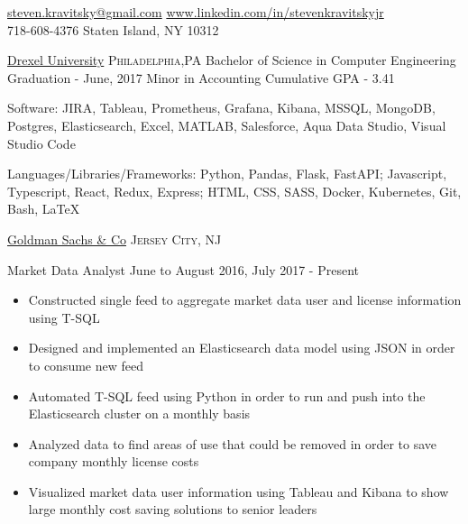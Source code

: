 \documentclass[10pt,letterpaper]{article}
\begin{document}
\sloppy  %

\nobreakvspace{0.3em}  %

\noindent\href{mailto:steven.kravitsky@gmail.com}{steven.kravitsky\mbox{}@\mbox{}gmail.com}\sbull
\href{http://www.linkedin.com/in/stevenkravitskyjr}{www.linkedin.com/in/stevenkravitskyjr}
\\
718-608-4376\sbull
Staten Island, NY 10312

\spacedhrule{0.9em}{-0.4em}  %


\headedsection
  {\href{http://www.drexel.edu/}{Drexel University}}
  {\textsc{Philadelphia,PA}} {%
  \headedsubsectiontwo
    {Bachelor of Science in Computer Engineering}
    {Graduation - June, 2017}
    {Minor in Accounting}
    {Cumulative GPA - 3.41}
}

\spacedhrule{0.9em}{-0.4em}


\inlineheadsection  %
  {Software:}
  {JIRA, Tableau, Prometheus, Grafana, Kibana, MSSQL, MongoDB, Postgres, Elasticsearch, Excel, MATLAB, Salesforce, Aqua Data Studio, Visual Studio Code}

\vspace{0.1em}
\inlineheadsection
  {Languages/Libraries/Frameworks:}
  {Python, Pandas, Flask, FastAPI; Javascript, Typescript, React, Redux, Express; HTML, CSS, SASS, Docker, Kubernetes, Git, Bash, LaTeX}

\spacedhrule{0.9em}{-0.4em}


\headedsection  %
  {\href{http://www.goldmansachs.com/}{Goldman Sachs \& Co}}
  {\textsc{Jersey City, NJ}} {%
  \headedsubsection
    {Market Data  Analyst}
    {June to August 2016, July 2017 - Present}
    {\begin{itemize}
    \item Constructed single feed to aggregate  market data user and license information using T-SQL
    \item Designed and implemented an Elasticsearch data model using JSON in order to consume new feed
    \item Automated T-SQL feed using Python in order to run and push into the Elasticsearch cluster on a monthly basis
    \item Analyzed data to find areas of use that could be removed in order to save company monthly license costs
    \item Visualized market data user information using Tableau and Kibana to show large monthly cost saving solutions to senior leaders
    \end{itemize}}
}
\end{document}
